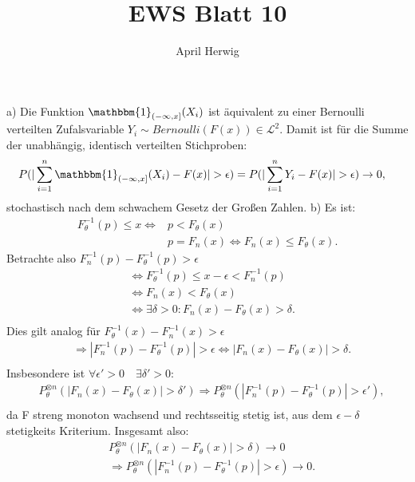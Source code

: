 \documentclass[draft]{article}
\title{EWS Blatt 10}
\author{April Herwig}
\begin{document}
\maketitle

a) Die Funktion $\mathbbm{1}_{(-\infty, x]} (X_i)$ ist äquivalent zu einer Bernoulli verteilten Zufalsvariable $Y_i \sim Bernoulli(F(x)) \in \mathcal{L}^2$. Damit ist für die Summe der unabhängig, identisch verteilten Stichproben: 
\begin{align*}
    &P(|\sum\limits_{i=1}^{n}\mathbbm{1}_{(-\infty, x]} (X_i)-F(x)|>\epsilon) = P(|\sum\limits_{i=1}^{n} Y_i-F(x)|>\epsilon) \rightarrow 0,
\end{align*}
stochastisch nach dem schwachem Gesetz der Großen Zahlen.
\newline
\newline
\newline
b) Es ist: 
\begin{align*}
    F_\theta^{-1}(p) \leq x \Leftrightarrow & p < F_\theta(x) \\
    & p = F_n(x) \Leftrightarrow F_n(x) \leq F_\theta(x) .
\end{align*}
Betrachte also $F_n^{-1}(p) - F_\theta^{-1}(p) > \epsilon$
\begin{align*}
    & \Leftrightarrow F_\theta^{-1}(p) \leq x - \epsilon < F_n^{-1}(p) \\
    & \Leftrightarrow F_n(x) < F_\theta(x) \\
    & \Leftrightarrow \exists \delta > 0 : F_n(x) - F_\theta(x) > \delta . \\
\end{align*}
Dies gilt analog für $F_\theta^{-1}(x) - F_n^{-1}(x) > \epsilon$
\begin{align*}
    & \Rightarrow |F_n^{-1}(p) - F_\theta^{-1}(p)| > \epsilon \Leftrightarrow |F_n(x) - F_\theta(x)| > \delta . \\ 
\end{align*}
Insbesondere ist $\forall\epsilon'>0\quad\exists\delta'>0 :$
\begin{align*}
    & P_\theta^{\otimes n}(|F_n(x) - F_\theta(x)| > \delta') \Rightarrow P_\theta^{\otimes n}(|F_n^{-1}(p) - F_\theta^{-1}(p)| > \epsilon') , \\
\end{align*}
da F streng monoton wachsend und rechtsseitig stetig ist, aus dem $\epsilon - \delta$ \newline
stetigkeits Kriterium. Insgesamt also:
\begin{align*}
    & P_\theta^{\otimes n}(|F_n(x) - F_\theta(x)| > \delta) \rightarrow 0 \\
    & \Rightarrow P_\theta^{\otimes n}(|F_n^{-1}(p) - F_\theta^{-1}(p)| > \epsilon) \rightarrow 0 . \\
\end{align*}
\end{document}

